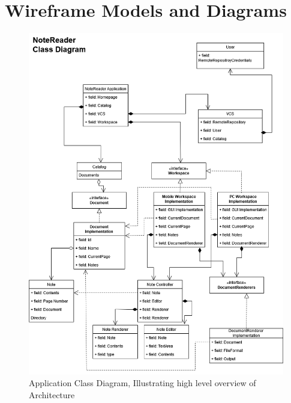 \chapter{Wireframe Models and Diagrams}
\label{Wireframes}

\begin{figure}
    \centering
    \includegraphics[width=1\linewidth]{Figures/Class Diagram.drawio(2).png}
    \caption{Application Class Diagram, Illustrating high level overview of Architecture}
    \label{fig:CD}
\end{figure}


